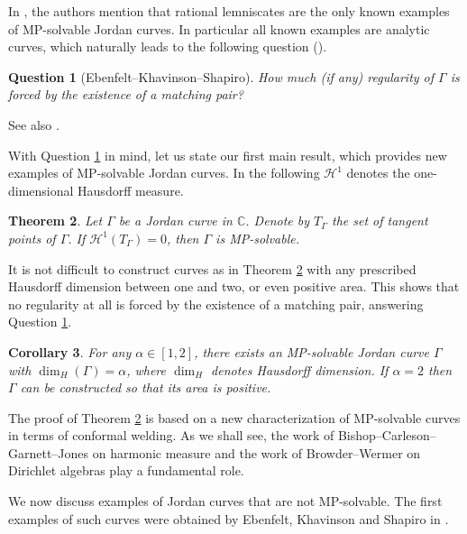 \documentclass{amsart}
\theoremstyle{plain}
\newtheorem{theorem}{Theorem}[section]
\newtheorem{corollary}[theorem]{Corollary}
\newtheorem{question}[theorem]{Question}
\theoremstyle{definition}
\theoremstyle{remark}
\newcommand{\mC}{\mathbb{C}}
\begin{document}
In \cite{EbenfeltKhavinsonShapiro2001}, the authors mention that rational lemniscates are the only known examples of MP-solvable Jordan curves. In particular all known examples are analytic curves, which naturally leads to the following question (\cite[Remark 1.5]{EbenfeltKhavinsonShapiro2001}).

\begin{question}[Ebenfelt--Khavinson--Shapiro]
\label{mainq}
How much (if any) regularity of $\Gamma$ is forced by the existence of a matching pair?
\end{question}

See also \cite[Problem 3.30]{HaymanLingham2019}.

With Question \ref{mainq} in mind, let us state our first main result, which provides new examples of MP-solvable Jordan curves. In the following $\mathcal{H}^1$ denotes the one-dimensional Hausdorff measure.

\begin{theorem}
\label{mainthm}
Let $\Gamma$ be a Jordan curve in $\mC$. Denote by $T_\Gamma$ the set of tangent points of $\Gamma$. If $\mathcal{H}^1(T_\Gamma)=0$, then $\Gamma$ is MP-solvable.
\end{theorem}

It is not difficult to construct curves as in Theorem \ref{mainthm} with any prescribed Hausdorff dimension between one and two, or even positive area. This shows that no regularity at all is forced by the existence of a matching pair, answering Question \ref{mainq}.

\begin{corollary}
\label{mainc}
For any $\alpha \in [1,2]$, there exists an MP-solvable Jordan curve $\Gamma$ with $\dim_H(\Gamma)=\alpha$, where $\dim_H$ denotes Hausdorff dimension. If $\alpha=2$ then $\Gamma$ can be constructed so that its area is positive.
\end{corollary}


The proof of Theorem \ref{mainthm} is based on a new characterization of MP-solvable curves in terms of conformal welding. As we shall see, the work of Bishop--Carleson--Garnett--Jones \cite{BishopCarlesonGarnettJones1989} on harmonic measure and the work of Browder--Wermer \cite{BrowderWermer1963} on Dirichlet algebras play a fundamental role.

We now discuss examples of Jordan curves that are not MP-solvable. The first examples of such curves were obtained by Ebenfelt, Khavinson and Shapiro in \cite{EbenfeltKhavinsonShapiro2001}.
\end{document}
